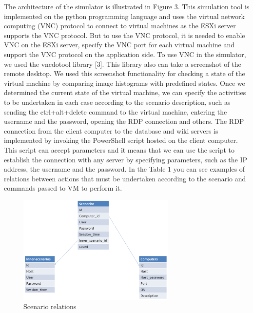 The architecture of the simulator is illustrated in Figure 3. This simulation tool is implemented on the python programming language and uses the virtual network computing (VNC) protocol to connect to virtual machines as the ESXi server supports the VNC protocol. But to use the VNC protocol, it is needed to enable VNC on the ESXi server, specify the VNC port for each virtual machine and support the VNC protocol on the application side. To use VNC in the simulator, we used the vncdotool library [3]. This library also can take a screenshot of the remote desktop. We used this screenshot functionality for checking a state of the virtual machine by comparing image histograms with predefined states. Once we determined the current state of the virtual machine, we can specify the activities to be undertaken in each case according to the scenario description, such as sending the ctrl+alt+delete command to the virtual machine, entering the username and the password, opening the RDP connection and others. The RDP connection from the client computer to the database and wiki servers is implemented by invoking the PowerShell script hosted on the client computer. This script can accept parameters and it means that we can use the script to establish the connection with any server by specifying parameters, such as the IP address, the username and the password. In the Table 1 you can see examples of relations between actions that must be undertaken according to the scenario and commands passed to VM to perform it.



\begin{figure}[ht!]
\centering
\includegraphics[width=0.7\textwidth]{scenario_relations.png}
\caption{Scenario relations}
\label{overflow}
\end{figure}


